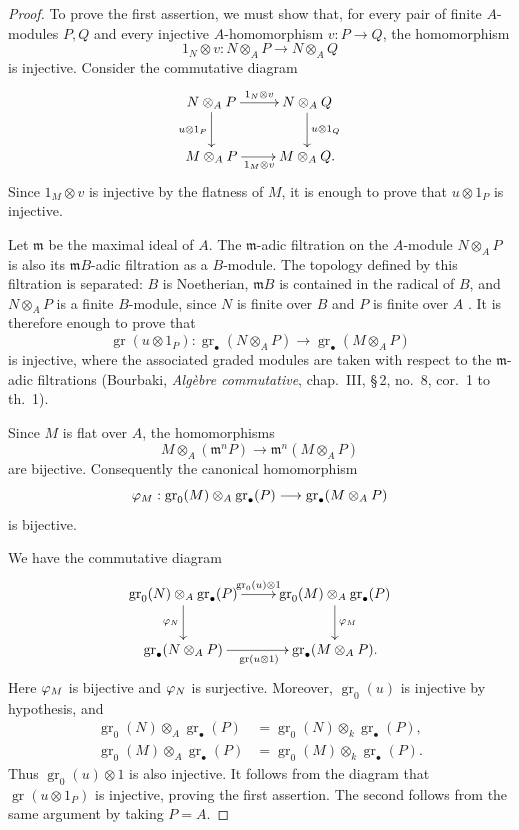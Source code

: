\begin{proof}
To prove the first assertion, we must show that, for every pair of
finite $A$-modules $P,Q$ and every injective $A$-homomorphism
$v:P\to Q$, the homomorphism
\[
  1_N\otimes v:N\otimes_A P\longrightarrow N\otimes_A Q
\]
is injective.  Consider the commutative diagram
\[
  \xymatrix{
    N\otimes_A P
      \ar[r]^-{1_N\otimes v}
      \ar[d]_{u\otimes1_P}
      &
    N\otimes_A Q
      \ar[d]^{u\otimes1_Q}
    \\
    M\otimes_A P
      \ar[r]_{1_M\otimes v}
      &
    M\otimes_A Q .
  }
\]
Since $1_M\otimes v$ is injective by the flatness of $M$, it is
enough to prove that $u\otimes1_P$ is injective.

Let $\mathfrak m$ be the maximal ideal of $A$.  The
$\mathfrak m$-adic filtration on the $A$-module $N\otimes_A P$ is
also its $\mathfrak mB$-adic filtration as a $B$-module.  The
topology defined by this filtration is separated: $B$ is
Noetherian, $\mathfrak mB$ is contained in the radical of $B$, and
$N\otimes_A P$ is a finite $B$-module, since $N$ is finite over $B$
and $P$ is finite over $A$ .  It is therefore
enough to prove that
\[
  \operatorname{gr}(u\otimes1_P):
  \operatorname{gr}_\bullet(N\otimes_A P)
  \longrightarrow
  \operatorname{gr}_\bullet(M\otimes_A P)
\]
is injective, where the associated graded modules are taken with
respect to the $\mathfrak m$-adic filtrations (Bourbaki,
\emph{Alg\`ebre commutative}, chap.~III, \S\,2, no.~8, cor.~1 to
th.~1).

Since $M$ is flat over $A$, the homomorphisms
\[
  M\otimes_A(\mathfrak m^nP)
  \longrightarrow
  \mathfrak m^n(M\otimes_A P)
\]
are bijective.  Consequently the canonical homomorphism
\[
  \varphi_M:
  \operatorname{gr}_0(M)\otimes_A\operatorname{gr}_\bullet(P)
  \longrightarrow
  \operatorname{gr}_\bullet(M\otimes_A P)
\]
is bijective.


We have the commutative diagram
\[
  \xymatrix{
    \operatorname{gr}_0(N)\otimes_A\operatorname{gr}_\bullet(P)
      \ar[r]^-{\operatorname{gr}_0(u)\otimes1}
      \ar[d]_{\vphi_N}
      &
    \operatorname{gr}_0(M)\otimes_A\operatorname{gr}_\bullet(P)
      \ar[d]^{\vphi_M}
    \\
    \operatorname{gr}_\bullet(N\otimes_A P)
      \ar[r]_{\operatorname{gr}(u\otimes1)}
      &
    \operatorname{gr}_\bullet(M\otimes_A P).
  }
\]
Here $\varphi_M$ is bijective and $\varphi_N$ is surjective.
Moreover, $\operatorname{gr}_0(u)$ is injective by hypothesis, and
\[
\begin{split}
  \operatorname{gr}_0(N)\otimes_A\operatorname{gr}_\bullet(P)
    &=
  \operatorname{gr}_0(N)\otimes_k\operatorname{gr}_\bullet(P),\\
  \operatorname{gr}_0(M)\otimes_A\operatorname{gr}_\bullet(P)
    &=
  \operatorname{gr}_0(M)\otimes_k\operatorname{gr}_\bullet(P).
\end{split}
\]
Thus $\operatorname{gr}_0(u)\otimes1$ is also injective.  It
follows from the diagram that $\operatorname{gr}(u\otimes1_P)$ is
injective, proving the first assertion.  The second follows from
the same argument by taking $P=A$.
\end{proof}

